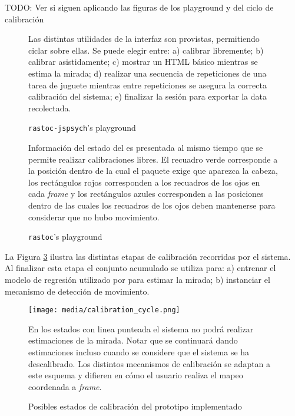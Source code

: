 TODO: Ver si siguen aplicando las figuras de los playground y del ciclo de calibración

\begin{figure}
    \centering
    \caption{\texttt{rastoc-jspsych}’s playground}
    Las distintas utilidades de la interfaz \jspsych son provistas, permitiendo
    ciclar sobre ellas.
    Se puede elegir entre:
    a) calibrar libremente;
    b) calibrar asistidamente;
    c) mostrar un HTML básico mientras se estima la mirada;
    d) realizar una secuencia de repeticiones de una tarea de juguete mientras
    entre repeticiones se asegura la correcta calibración del sistema;
    e) finalizar la sesión para exportar la data recolectada.
    \label{fig:rastoc-jspsych-playground}
\end{figure}

\begin{figure}
    \centering
    \caption{\texttt{rastoc}’s playground}
    Información del estado del \eyetracker es presentada al mismo tiempo que se
    permite realizar calibraciones libres.
    El recuadro verde corresponde a la posición dentro de la cual el paquete
    \webgazer exige que aparezca la cabeza, los rectángulos rojos corresponden
    a los recuadros de los ojos en cada \textit{frame} y los rectángulos azules
    corresponden a las posiciones dentro de las cuales los recuadros de los
    ojos deben mantenerse para considerar que no hubo movimiento.
    \label{fig:rastoc-playground}
\end{figure}

La Figura \ref{fig:calibration_cycle} ilustra las distintas etapas de
calibración recorridas por el sistema.
Al finalizar esta etapa el conjunto acumulado se utiliza para: a) entrenar el
modelo de regresión utilizado por \webgazer para estimar la mirada; b)
instanciar el mecanismo de detección de movimiento.

\begin{figure}
    \centering
    \texttt{[image: media/calibration\_cycle.png]}
    \caption{Posibles estados de calibración del prototipo implementado}
    En los estados con linea punteada el sistema no podrá realizar estimaciones
    de la mirada.
    Notar que se continuará dando estimaciones incluso cuando se considere que
    el sistema se ha descalibrado.
    Los distintos mecanismos de calibración se adaptan a este esquema y
    difieren en cómo el usuario realiza el mapeo coordenada a \textit{frame}.
    \label{fig:calibration_cycle}
\end{figure}


